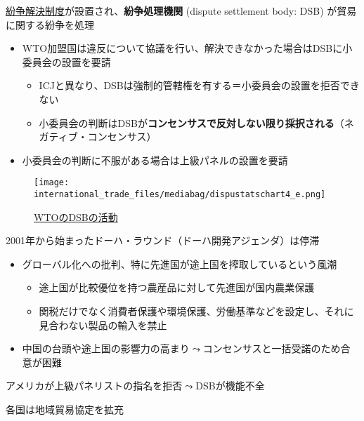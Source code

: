 \documentclass[
  xelatex,
  ja=standard]{bxjsarticle}
\providecommand{\tightlist}{%
  \setlength{\itemsep}{0pt}\setlength{\parskip}{0pt}}\usepackage{longtable,booktabs,array}
\begin{document}
\href{https://www.mofa.go.jp/mofaj/gaiko/wto/funso/seido.html}{紛争解決制度}が設置され、\textbf{紛争処理機関}
(dispute settlement body: DSB) が貿易に関する紛争を処理

\begin{itemize}
\tightlist
\item
  WTO加盟国は違反について協議を行い、解決できなかった場合はDSBに小委員会の設置を要請

  \begin{itemize}
  \tightlist
  \item
    ICJと異なり、DSBは強制的管轄権を有する＝小委員会の設置を拒否できない
  \item
    小委員会の判断はDSBが\textbf{コンセンサスで反対しない限り採択される}（ネガティブ・コンセンサス）
  \end{itemize}
\item
  小委員会の判断に不服がある場合は上級パネルの設置を要請
\end{itemize}

\begin{figure}[htpb]

{\centering \texttt{[image: international\_trade\_files/mediabag/dispustatschart4\_e.png]}

}

\caption{\href{https://www.wto.org/english/tratop_e/dispu_e/dispustats_e.htm}{WTOのDSBの活動}}

\end{figure}

2001年から始まったドーハ・ラウンド（ドーハ開発アジェンダ）は停滞

\begin{itemize}
\tightlist
\item
  グローバル化への批判、特に先進国が途上国を搾取しているという風潮

  \begin{itemize}
  \tightlist
  \item
    途上国が比較優位を持つ農産品に対して先進国が国内農業保護
  \item
    関税だけでなく消費者保護や環境保護、労働基準などを設定し、それに見合わない製品の輸入を禁止
  \end{itemize}
\item
  中国の台頭や途上国の影響力の高まり\(\leadsto\)コンセンサスと一括受諾のため合意が困難
\end{itemize}

アメリカが上級パネリストの指名を拒否\(\leadsto\)DSBが機能不全

各国は地域貿易協定を拡充
\end{document}
